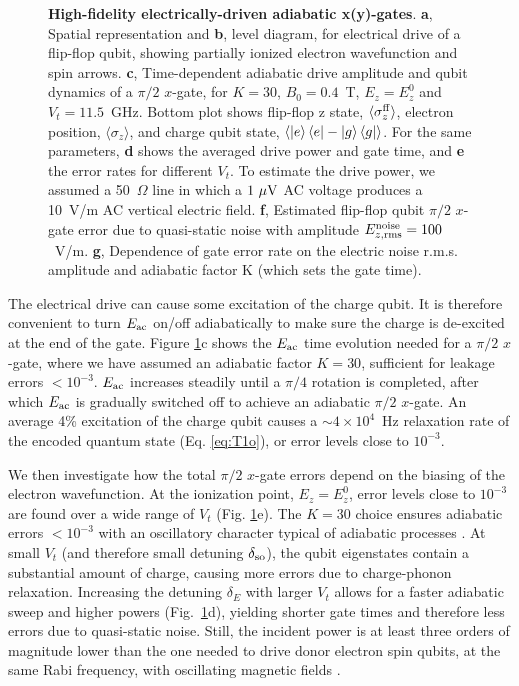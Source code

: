 \documentclass[aps,prb,superscriptaddress,nobibnotes,twocolumn]{revtex4-1}
\begin{document}
\begin{figure}
	\centering
		\caption{\textbf{High-fidelity electrically-driven adiabatic x(y)-gates}. \textbf{a}, Spatial representation and \textbf{b}, level diagram, for electrical drive of a flip-flop qubit, showing partially ionized electron wavefunction and spin arrows.
		\textbf{c}, Time-dependent adiabatic drive amplitude and qubit dynamics of a $\pi/2$ $x$-gate, for $K=30$, $B_0=0.4$~T, $E_z=E_z^0$ and $V_t=11.5$~GHz. Bottom plot shows flip-flop z state, $\langle\sigma_z^{\rm ff}\rangle$, electron position, $\langle\sigma_z\rangle$, and charge qubit state, $\langle\ket{e}\bra{e}-\ket{g}\bra{g}\rangle$.
		For the same parameters, \textbf{d} shows the averaged drive power and gate time, and \textbf{e} the error rates for different $V_t$. To estimate the drive power, we assumed a 50~$\Omega$ line in which a $1~{\rm \mu V}$ AC voltage produces a 10~V/m AC vertical electric field.
		\textbf{f}, Estimated flip-flop qubit $\pi/2$ $x$-gate error due to quasi-static noise with amplitude $E_{z, \rm rms}^{\rm noise}=100$~V/m.
		\textbf{g}, Dependence of gate error rate on the electric noise r.m.s. amplitude and adiabatic factor K (which sets the gate time).}
	\label{fig:1-qubit}
\end{figure}


The electrical drive can cause some excitation of the charge qubit. It is therefore convenient to turn $E_{\rm ac}$ on/off adiabatically to make sure the charge is de-excited at the end of the gate. Figure \ref{fig:1-qubit}c shows the $E_{\rm ac}$ time evolution needed for a $\pi/2$ $x$-gate, where we have assumed an adiabatic factor $K=30$, sufficient for leakage errors $<10^{-3}$. $E_{\rm ac}$ increases steadily until a $\pi/4$ rotation is completed, after which $E_{\rm ac}$ is gradually switched off to achieve an adiabatic $\pi/2$ $x$-gate. An average 4\% excitation of the charge qubit causes a $\sim4\times10^4$~Hz relaxation rate of the encoded quantum state (Eq. \ref{eq:T1o}), or error levels close to $10^{-3}$. 

We then investigate how the total $\pi/2$ $x$-gate errors depend on the biasing of the electron wavefunction. At the ionization point, $E_z=E_z^0$, error levels close to $10^{-3}$ are found over a wide range of $V_t$ (Fig. \ref{fig:1-qubit}e). The $K=30$ choice ensures adiabatic errors $<10^{-3}$ with an oscillatory character typical of adiabatic processes \cite{Oh2013}. At small $V_t$ (and therefore small detuning $\delta_{\rm so}$), the qubit eigenstates contain a substantial amount of charge, causing more errors due to charge-phonon relaxation. Increasing the detuning $\delta_E$ with larger $V_t$ allows for a faster adiabatic sweep and higher powers (Fig.~\ref{fig:1-qubit}d), yielding shorter gate times and therefore less errors due to quasi-static noise. Still, the incident power is at least three orders of magnitude lower than the one needed to drive donor electron spin qubits, at the same Rabi frequency, with oscillating magnetic fields \cite{Pla2012,Muhonen2014}.
\end{document}
